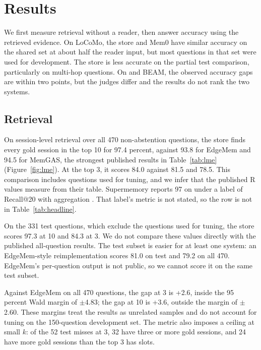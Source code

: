 \section{Results}
\label{sec:results}

We first measure retrieval without a reader, then answer accuracy using the retrieved evidence. On LoCoMo, the store and Mem0 have similar accuracy on the shared set at about half the reader input, but most questions in that set were used for development. The store is less accurate on the partial test comparison, particularly on multi-hop questions. On \lmes{} and BEAM, the observed accuracy gaps are within two points, but the judges differ and the results do not rank the two systems.

\subsection{Retrieval}
\label{sec:retrieval}

On session-level retrieval over all 470 non-abstention \lmes{} questions, the store finds every gold session in the top 10 for 97.4 percent, against 93.8 for EdgeMem and 94.5 for MemGAS, the strongest published results in Table~\ref{tab:lme} (Figure~\ref{fig:lme}). At the top 3, it scores 84.0 against 81.5 and 78.5. This comparison includes questions used for tuning, and we infer that the published R values measure  from their table. Supermemory reports 97 on \lmes{} under a label of Recall@20 with aggregation \citep{supermemory2026longmembench}. That label's metric is not stated, so the row is not in Table~\ref{tab:headline}.

On the 331 test questions, which exclude the questions used for tuning, the store scores 97.3 at 10 and 84.3 at 3. We do not compare these values directly with the published all-question results. The test subset is easier for at least one system: an EdgeMem-style reimplementation scores 81.0  on test and 79.2 on all 470. EdgeMem's per-question output is not public, so we cannot score it on the same test subset.

Against EdgeMem on all 470 questions, the gap at 3 is +2.6, inside the 95 percent Wald margin of $\pm$4.83; the gap at 10 is +3.6, outside the margin of $\pm$2.60. These margins treat the results as unrelated samples and do not account for tuning on the 150-question development set. The metric also imposes a ceiling at small $k$: of the 52 test misses at 3, 32 have three or more gold sessions, and 24 have more gold sessions than the top 3 has slots.

